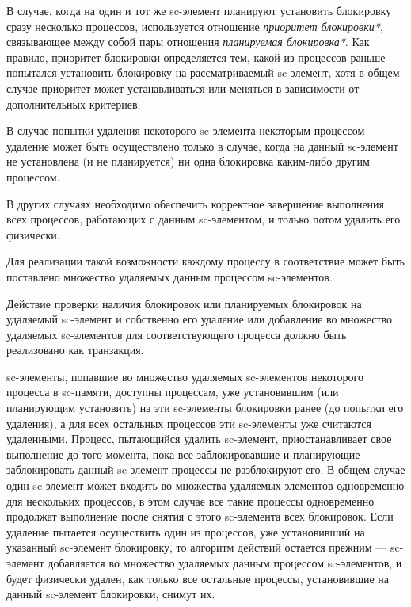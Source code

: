 \begin{SCn}
\end{SCn}

В случае, когда на один и тот же sc-элемент планируют установить блокировку сразу несколько процессов, используется отношение \textit{приоритет блокировки*}, связывающее между собой пары отношения \textit{планируемая блокировка*}. Как правило, приоритет блокировки определяется тем, какой из процессов раньше попытался установить блокировку на рассматриваемый sc-элемент, хотя в общем случае приоритет может устанавливаться или меняться в зависимости от дополнительных критериев.

В случае попытки удаления некоторого sc-элемента некоторым процессом удаление может быть осуществлено только в случае, когда на данный sc-элемент не установлена (и не планируется) ни одна блокировка каким-либо другим процессом.
	
В других случаях необходимо обеспечить корректное завершение выполнения всех процессов, работающих с данным sc-элементом, и только потом удалить его физически.
	
Для реализации такой возможности каждому процессу в соответствие может быть поставлено множество удаляемых данным процессом sc-элементов.

Действие проверки наличия блокировок или планируемых блокировок на удаляемый sc-элемент и собственно его удаление или добавление во множество удаляемых sc-элементов для соответствующего процесса должно быть реализовано как транзакция.

\begin{SCn}
\end{SCn}

sc-элементы, попавшие во множество удаляемых sc-элементов некоторого процесса в sc-памяти, доступны процессам, уже установившим (или планирующим установить) на эти sc-элементы блокировки ранее (до попытки его удаления), а для всех остальных процессов эти sc-элементы уже считаются удаленными. Процесс, пытающийся удалить sc-элемент, приостанавливает свое выполнение до того момента, пока все заблокировавшие и планирующие заблокировать данный sc-элемент процессы не разблокируют его. В общем случае один sc-элемент может входить во множества удаляемых элементов одновременно для нескольких процессов, в этом случае все такие процессы одновременно продолжат выполнение после снятия с этого sc-элемента всех блокировок. Если удаление пытается осуществить один из процессов, уже установивший на указанный sc-элемент блокировку, то алгоритм действий остается прежним --- sc-элемент добавляется во множество удаляемых данным процессом sc-элементов, и будет физически удален, как только все остальные процессы, установившие на данный sc-элемент блокировки, снимут их.

